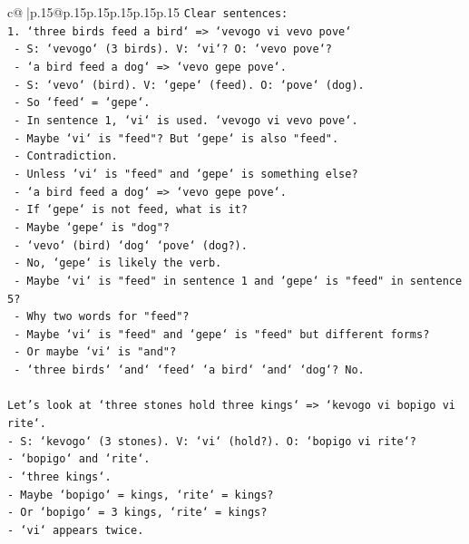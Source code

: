 \documentclass{article}
\begin{document}
{\begin{supertabular}{c@{$\;$}|p{.15\linewidth}@{}p{.15\linewidth}p{.15\linewidth}p{.15\linewidth}p{.15\linewidth}p{.15\linewidth}}
{{{\texttt{Clear sentences:} \\
\texttt{1. `three birds feed a bird` => `vevogo vi vevo pove`} \\
\texttt{   {-} S: `vevogo` (3 birds). V: `vi`? O: `vevo pove`?} \\
\texttt{   {-} `a bird feed a dog` => `vevo gepe pove`.} \\
\texttt{   {-} S: `vevo` (bird). V: `gepe` (feed). O: `pove` (dog).} \\
\texttt{   {-} So `feed` = `gepe`.} \\
\texttt{   {-} In sentence 1, `vi` is used. `vevogo vi vevo pove`.} \\
\texttt{   {-} Maybe `vi` is "feed"? But `gepe` is also "feed".} \\
\texttt{   {-} Contradiction.} \\
\texttt{   {-} Unless `vi` is "feed" and `gepe` is something else?} \\
\texttt{   {-} `a bird feed a dog` => `vevo gepe pove`.} \\
\texttt{   {-} If `gepe` is not feed, what is it?} \\
\texttt{   {-} Maybe `gepe` is "dog"?} \\
\texttt{   {-} `vevo` (bird) `dog` `pove` (dog?).} \\
\texttt{   {-} No, `gepe` is likely the verb.} \\
\texttt{   {-} Maybe `vi` is "feed" in sentence 1 and `gepe` is "feed" in sentence 5?} \\
\texttt{   {-} Why two words for "feed"?} \\
\texttt{   {-} Maybe `vi` is "feed" and `gepe` is "feed" but different forms?} \\
\texttt{   {-} Or maybe `vi` is "and"?} \\
\texttt{   {-} `three birds` `and` `feed` `a bird` `and` `dog`? No.} \\
\\ 
\texttt{Let's look at `three stones hold three kings` => `kevogo vi bopigo vi rite`.} \\
\texttt{{-} S: `kevogo` (3 stones). V: `vi` (hold?). O: `bopigo vi rite`?} \\
\texttt{{-} `bopigo` and `rite`.} \\
\texttt{{-} `three kings`.} \\
\texttt{{-} Maybe `bopigo` = kings, `rite` = kings?} \\
\texttt{{-} Or `bopigo` = 3 kings, `rite` = kings?} \\
\texttt{{-} `vi` appears twice.} \\
}}}
\end{supertabular}}
\end{document}
